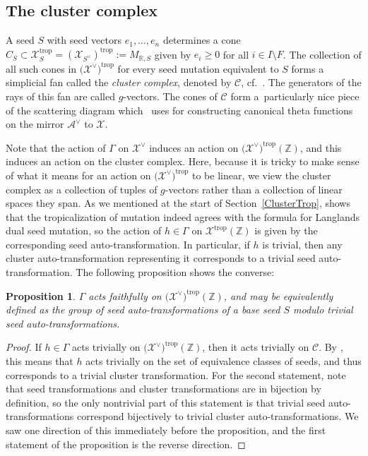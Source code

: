 \documentclass[11pt]{article}
\numberwithin{equation}{section}
\numberwithin{figure}{section}
\numberwithin{table}{section}
\DeclareMathOperator{\trop}{trop}
\let\bb=\mathbb
\let\s=\mathcal
\newtheorem{prop}[thm]{Proposition}
\theoremstyle{definition}
\begin{document}
\subsection{The cluster complex}\label{ClusterComplex}
A seed $S$ with seed vectors $e_1,\dots,e_n$ determines a cone $C_S \subset \s{X}_S^{\trop}=(\s{X}_{S^{\vee}})^{\trop}:=M_{\bb{R},S}$ given by $e_i \geq 0$ for all $i\in I\setminus F$. The collection of all such cones in $\big(\s{X}^{\vee}\big)^{\trop}$ for every seed mutation equivalent to $S$ forms a simplicial fan called the {\it cluster complex}, denoted by $\s{C}$, cf.\ \cite[Theorem~0.8]{GHKK}. The generators of the rays of this fan are called $g$-vectors. The cones of $\s{C}$ form a~particularly nice piece of the scattering diagram which~\cite{GHKK} uses for constructing canonical theta functions on the mirror $\s{A}^{\vee}$ to $\s{X}$.

Note that the action of $\Gamma$ on $\s{X}^{\vee}$ induces an action on $\big(\s{X}^{\vee}\big)^{\trop}(\bb{Z})$, and this induces an action on the cluster complex. Here, because it is tricky to make sense of what it means for an action on $\big(\s{X}^{\vee}\big)^{\trop}$ to be linear, we view the cluster complex as a collection of tuples of $g$-vectors rather than a collection of linear spaces they span. As we mentioned at the start of Section~\ref{ClusterTrop}, \cite{GHK3} shows that the tropicalization of mutation indeed agrees with the formula for Langlands dual seed mutation, so the action of $h\in \Gamma$ on $\s{X}^{\trop}(\bb{Z})$ is given by the corresponding seed auto-transformation. In particular, if $h$ is trivial, then any cluster auto-transformation representing it corresponds to a trivial seed auto-transformation. The following proposition shows the converse:

\begin{prop}\label{TropClust}
$\Gamma$ acts faithfully on $\big(\s{X}^{\vee}\big)^{\trop}(\bb{Z})$, and may be equivalently defined as the group of seed auto-transformations of a base seed $S$ modulo trivial seed auto-transformations.
\end{prop}
\begin{proof}If $h \in \Gamma$ acts trivially on $\big(\s{X}^{\vee}\big)^{\trop}(\bb{Z})$, then it acts trivially on $\s{C}$. By \cite[Theorem~0.8]{GHKK}, this means that $h$ acts trivially on the set of equivalence classes of seeds, and thus corresponds to a trivial cluster transformation. For the second statement, note that seed transformations and cluster transformations are in bijection by definition, so the only nontrivial part of this statement is that trivial seed auto-transformations correspond bijectively to trivial cluster auto-transformations. We saw one direction of this immediately before the proposition, and the first statement of the proposition is the reverse direction.
\end{proof}
\end{document}
